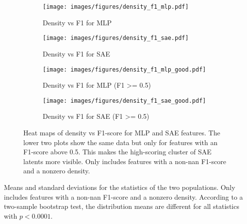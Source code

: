 \begin{figure}[h]
    \centering
    
    \begin{subfigure}[b]{0.45\textwidth}
        \centering
        \texttt{[image: images/figures/density\_f1\_mlp.pdf]}
        \caption{Density vs F1 for MLP}
        \label{fig:density_f1_mlp}
    \end{subfigure}
    \begin{subfigure}[b]{0.45\textwidth}
        \centering
        \texttt{[image: images/figures/density\_f1\_sae.pdf]}
        \caption{Density vs F1 for SAE}
        \label{fig:density_f1_sae}
    \end{subfigure}
    
    \begin{subfigure}[b]{0.45\textwidth}
        \centering
        \texttt{[image: images/figures/density\_f1\_mlp\_good.pdf]}
        \caption{Density vs F1 for MLP (F1 >= 0.5)}
        \label{fig:density_f1_mlp_good}
    \end{subfigure}
    \begin{subfigure}[b]{0.45\textwidth}
        \centering
        \texttt{[image: images/figures/density\_f1\_sae\_good.pdf]}
        \caption{Density vs F1 for SAE (F1 >= 0.5)}
        \label{fig:density_f1_sae_good}
    \end{subfigure}
    
    \caption{Heat maps of density vs F1-score for MLP and SAE features. The lower two plots show the same data but only for features with an F1-score above 0.5. This makes the high-scoring cluster of SAE latents more visible. Only includes features with a non-nan F1-score and a nonzero density.}
    \label{fig:density_f1}
\end{figure}

\begin{table}[]
    \centering
    
    \caption{Means and standard deviations for the statistics of the two populations. Only includes features with a non-nan F1-score and a nonzero density. According to a two-sample bootstrap test, the distribution means are different for all statistics with $p<0.0001$.}
    \label{tab:directions}
\end{table}